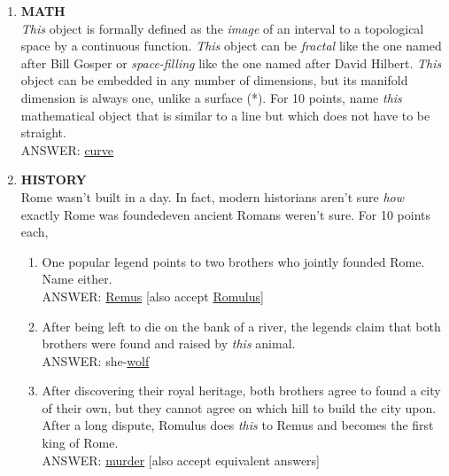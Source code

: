 \documentclass{report}
\newcommand*{\backtrack}{\setcounter{enumi}{\numexpr\theenumi-1\relax}}
\begin{document}
\begin{enumerate}
    \item \textbf{MATH} \\ \textit{This} object is formally defined as the \textit{image} of an interval to a topological space by a continuous function. \textit{This} object can be  \textit{fractal} like the one named after Bill Gosper or \textit{space-filling} like the one named after David Hilbert. \textit{This} object can be embedded in any number of dimensions, but its manifold dimension is always one, unlike a surface (*). For 10 points, name \textit{this} mathematical object that is similar to a line but which does not have to be straight. \\ ANSWER: \underline{curve} \backtrack
    \item \textbf{HISTORY} \\ Rome wasn't built in a day. In fact, modern historians aren't sure \textit{how} exactly Rome was founded\textemdash even ancient Romans weren't sure. For 10 points each,
    \begin{enumerate}[label=\Alph*]
        \item One popular legend points to two brothers who jointly founded Rome. Name either. \\ ANSWER: \underline{Remus} [also accept \underline{Romulus}]
        \item After being left to die on the bank of a river, the legends claim that both brothers were found and raised by \textit{this} animal. \\ ANSWER: she-\underline{wolf}
        \item After discovering their royal heritage, both brothers agree to found a city of their own, but they cannot agree on which hill to build the city upon. After a long dispute, Romulus does \textit{this} to Remus and becomes the first king of Rome. \\ ANSWER: \underline{murder} [also accept equivalent answers]
    \end{enumerate}
    

\end{enumerate}
\end{document}
